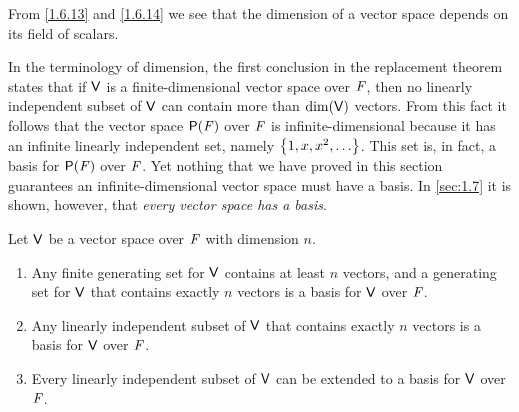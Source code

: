 \begin{note}
  From \cref{1.6.13} and \cref{1.6.14} we see that the dimension of a vector space depends on its field of scalars.
\end{note}

\begin{note}
  In the terminology of dimension, the first conclusion in the replacement theorem states that if \(\mathsf{V}\) is a finite-dimensional vector space over \(\mathit{F}\), then no linearly independent subset of \(\mathsf{V}\) can contain more than \(\dim(\mathsf{V})\) vectors.
  From this fact it follows that the vector space \(\ps{\F}\) over \(\mathit{F}\) is infinite-dimensional because it has an infinite linearly independent set, namely \(\set{1, x, x^2, \dots}\).
  This set is, in fact, a basis for \(\ps{\F}\) over \(\mathit{F}\).
  Yet nothing that we have proved in this section guarantees an infinite-dimensional vector space must have a basis.
  In \cref{sec:1.7} it is shown, however, that \emph{every vector space has a basis}.
\end{note}

\begin{cor}\label{1.6.15}
  Let \(\mathsf{V}\) be a vector space over \(\mathit{F}\) with dimension \(n\).
  \begin{enumerate}
    \item Any finite generating set for \(\mathsf{V}\) contains at least \(n\) vectors, and a generating set for \(\mathsf{V}\) that contains exactly \(n\) vectors is a basis for \(\mathsf{V}\) over \(\mathit{F}\).
    \item Any linearly independent subset of \(\mathsf{V}\) that contains exactly \(n\) vectors is a basis for \(\mathsf{V}\) over \(\mathit{F}\).
    \item Every linearly independent subset of \(\mathsf{V}\) can be extended to a basis for \(\mathsf{V}\) over \(\mathit{F}\).
  \end{enumerate}
\end{cor}

